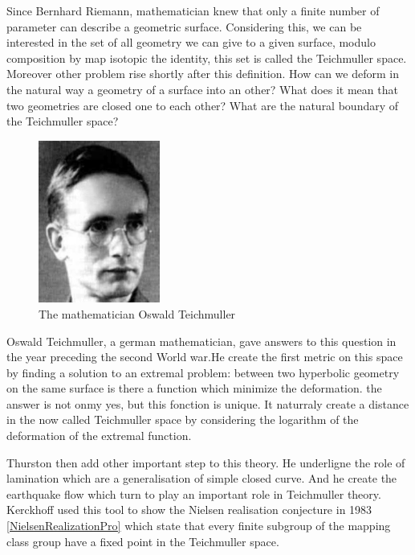 
\hspace{20 px} Since Bernhard Riemann, mathematician knew that only a finite number of parameter can describe a geometric surface. Considering this, we can be interested in the set of all geometry we can give to a given surface, modulo composition by map isotopic the identity, this set is called the Teichmuller space. Moreover other problem rise shortly after this definition. How can we deform in the natural way a geometry of a surface into an other? What does it mean that two geometries are closed one to each other? What are the natural boundary of the Teichmuller space?

\begin{figure}
  \centering
  \includegraphics[width=4cm]{Image/Teichmuller.jpeg}
  \caption{The mathematician Oswald Teichmuller}
\end{figure}

\vspace{10 px}

Oswald Teichmuller, a german mathematician, gave answers to this question in the year preceding the second World war.He create the first metric on this space by finding a solution to an extremal problem: between two hyperbolic geometry on the same surface is there a function which minimize the deformation. the answer is not onmy yes, but this fonction is unique. It naturraly create a distance in the now called Teichmuller space by considering the logarithm of the deformation of the extremal function.


\vspace{10 px}

Thurston then add other important step to this theory. He underligne the role of lamination which are a generalisation of simple closed curve. And he create the earthquake flow which turn to play an important role in Teichmuller theory.
Kerckhoff used this tool to show the Nielsen realisation conjecture in 1983 \ref{NielsenRealizationPro} which state that every finite subgroup of the mapping class group have a fixed point in the Teichmuller space.

